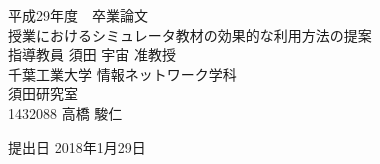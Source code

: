\documentclass[a4j,11pt]{jsarticle}
\begin{document}
\thispagestyle{empty}			%

\setcounter{tocdepth}{3}
\begin{center}

\huge 平成29年度　卒業論文
\\[100pt]
\HUGE 授業におけるシミュレータ教材の効果的な利用方法の提案
\\[120pt]
\huge 指導教員 須田 宇宙 准教授
\\[60pt]
千葉工業大学 情報ネットワーク学科\\
須田研究室
\\[60pt]
1432088 \hspace{70pt} 高橋 駿仁
\\[75pt]

\end{center}
\begin{flushright}

\huge 提出日 2018年1月29日

\end{flushright}



\newpage
\pagestyle{empty}
\normalsize
\tableofcontents
\newpage
\listoffigures



\newpage
{}
\pagestyle{plain}



\newpage


\newpage


\newpage


%

\newpage


\newpage


\newpage


\newpage


\newpage


\newpage

\end{document}

